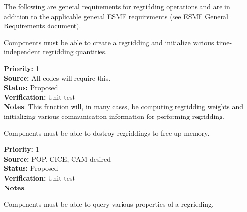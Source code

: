 


The following are general requirements for regridding operations and are in
addition to the applicable general ESMF requirements (see ESMF General
Requirements document).


Components must be able to create a regridding and initialize
various time-independent regridding quantities.

\begin{reqlist}
{\bf Priority:} 1 \\
{\bf Source:} All codes will require this. \\
{\bf Status:} Proposed \\
{\bf Verification:} Unit test \\
{\bf Notes:} This function will, in many cases, be computing
             regridding weights and initializing various
             communication information for performing regridding.
\end{reqlist}


Components must be able to destroy regriddings to free up memory.

\begin{reqlist}
{\bf Priority:} 1 \\
{\bf Source:} POP, CICE, CAM desired \\
{\bf Status:} Proposed \\
{\bf Verification:} Unit test \\
{\bf Notes:} 
\end{reqlist}


Components must be able to query various properties of a regridding.

